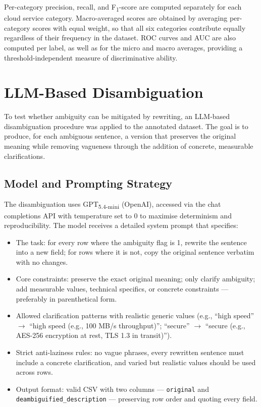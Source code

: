Per-category precision, recall, and F\textsubscript{1}-score are computed separately for each cloud service category. Macro-averaged scores are obtained by averaging per-category scores with equal weight, so that all six categories contribute equally regardless of their frequency in the dataset. ROC curves and AUC are also computed per label, as well as for the micro and macro averages, providing a threshold-independent measure of discriminative ability.

\section{LLM-Based Disambiguation}

To test whether ambiguity can be mitigated by rewriting, an LLM-based disambiguation procedure was applied to the annotated dataset. The goal is to produce, for each ambiguous sentence, a version that preserves the original meaning while removing vagueness through the addition of concrete, measurable clarifications.

\subsection{Model and Prompting Strategy}

    The disambiguation uses GPT\textsubscript{5.4-mini} (OpenAI), accessed via the chat completions API with temperature set to 0 to maximise determinism and reproducibility. The model receives a detailed system prompt that specifies:

\begin{itemize}
    \item The task: for every row where the ambiguity flag is 1, rewrite the sentence into a new field; for rows where it is not, copy the original sentence verbatim with no changes.
    \item Core constraints: preserve the exact original meaning; only clarify ambiguity; add measurable values, technical specifics, or concrete constraints — preferably in parenthetical form.
    \item Allowed clarification patterns with realistic generic values (e.g., ``high speed'' $\rightarrow$ ``high speed (e.g., 100 MB/s throughput)''; ``secure'' $\rightarrow$ ``secure (e.g., AES-256 encryption at rest, TLS 1.3 in transit)'').
    \item Strict anti-laziness rules: no vague phrases, every rewritten sentence must include a concrete clarification, and varied but realistic values should be used across rows.
    \item Output format: valid CSV with two columns — \texttt{original} and \texttt{deambiguified\_description} — preserving row order and quoting every field.
\end{itemize}

